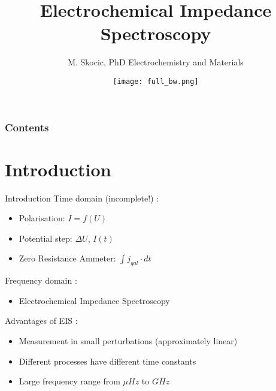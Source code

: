 \documentclass[10pt,compress,handout]{beamer}
\title{Electrochemical Impedance Spectroscopy}
\author{M. Skocic, PhD Electrochemistry and Materials}
\date{\vfill \texttt{[image: full\_bw.png]}}
\begin{document}
    \begin{frame}
        \titlepage
    \end{frame}

    \begin{frame}
        \frametitle{Contents}
        \tableofcontents
    \end{frame}
    
\section{Introduction}
    \begin{frame}{Introduction}
        Time domain (incomplete!) \citep{bard2001}:
        \begin{itemize}
            \item Polarisation: $I=f(U)$
            \item Potential step: $\Delta U$, $I(t)$
            \item Zero Resistance Ammeter: $\int j_{gal} \cdot dt$
        \end{itemize}

        Frequency domain \citep{bard2001}:
        \begin{itemize}
            \item Electrochemical Impedance Spectroscopy
        \end{itemize}

        Advantages of EIS \citep{bard2001}:
        \begin{itemize}
            \item Measurement in small perturbations (approximately linear)
            \item Different processes have different time constants
            \item Large frequency range from $\mu Hz$ to $GHz$
        \end{itemize}
    \end{frame}
\end{document}
